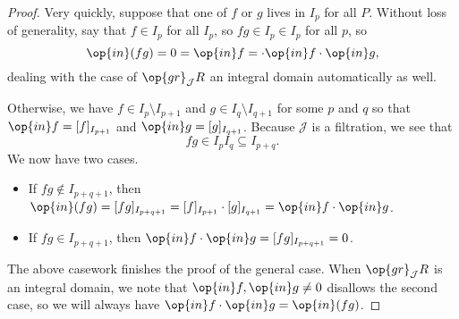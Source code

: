 \begin{proof}
	Very quickly, suppose that one of $f$ or $g$ lives in $I_p$ for all $P$. Without loss of generality, say that $f\in I_p$ for all $I_p$, so $fg\in I_p\in I_p$ for all $p$, so
	\[\op{in}(fg)=0=\op{in}f=\cdot\op{in}f\cdot\op{in}g,\]
	dealing with the case of $\op{gr}_\mathcal JR$ an integral domain automatically as well.

	Otherwise, we have $f\in I_p\setminus I_{p+1}$ and $g\in I_q\setminus I_{q+1}$ for some $p$ and $q$ so that $\op{in}f=[f]_{I_{p+1}}$ and $\op{in}g=[g]_{I_{q+1}}$. Because $\mathcal J$ is a filtration, we see that
	\[fg\in I_pI_q\subseteq I_{p+q}.\]
	We now have two cases.
	\begin{itemize}
		\item If $fg\notin I_{p+q+1}$, then $\op{in}(fg)=[fg]_{I_{p+q+1}}=[f]_{I_{p+1}}\cdot[g]_{I_{q+1}}=\op{in}f\cdot\op{in}g$.
		\item If $fg\in I_{p+q+1}$, then $\op{in}f\cdot\op{in}g=[fg]_{I_{p+q+1}}=0$.
	\end{itemize}
	The above casework finishes the proof of the general case. When $\op{gr}_\mathcal JR$ is an integral domain, we note that $\op{in}f,\op{in}g\ne0$ disallows the second case, so we will always have $\op{in}f\cdot\op{in}g=\op{in}(fg)$.
\end{proof}

